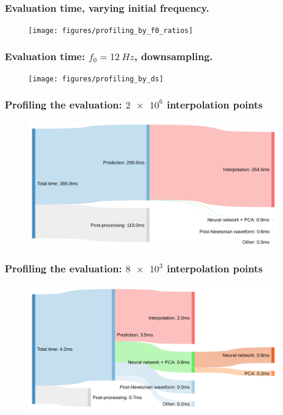 \documentclass{beamer}
\begin{document}
\begin{frame}
    \frametitle{Evaluation time, varying initial frequency.}    
    \begin{figure}[ht]
    \centering
    \texttt{[image: figures/profiling\_by\_f0\_ratios]}
    \label{fig:profiling_by_f0_ratios}
    \end{figure}
\end{frame}



\begin{frame}
    \frametitle{Evaluation time: \(f_0 = \SI{12}{Hz}\), downsampling.}    
    \begin{figure}[ht]
    \centering
    \texttt{[image: figures/profiling\_by\_ds]}
    \label{fig:profiling_by_ds}
    \end{figure}
\end{frame}

\begin{frame}
    \frametitle{Profiling the evaluation: \(\num{2e6}\) interpolation points}
    \begin{figure}[ht]
    \centering
    \includegraphics[width=\textwidth]{figures/sankey_full}
    \label{fig:sankey_full}
    \end{figure}
\end{frame}

\begin{frame}
    \frametitle{Profiling the evaluation: \(\num{8e3}\) interpolation points}
    \begin{figure}[ht]
    \centering
    \includegraphics[width=\textwidth]{figures/sankey_downsampled}
    \label{fig:sankey_downsampled}
    \end{figure}
\end{frame}
\end{document}

